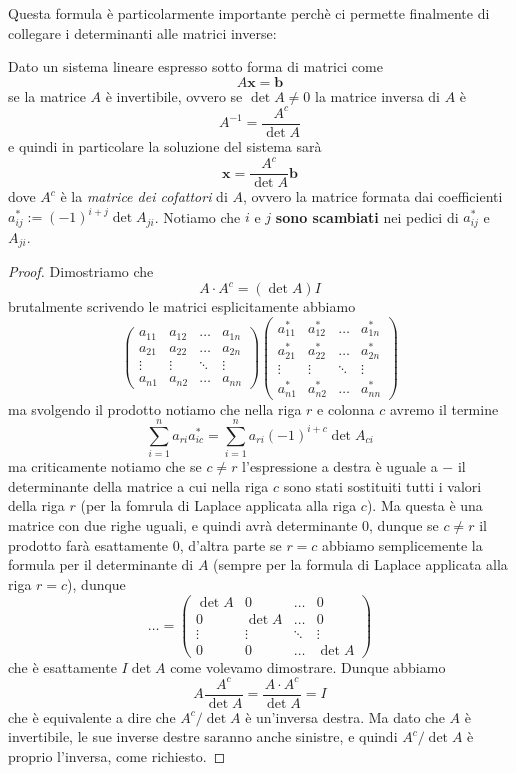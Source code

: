 \documentclass[11pt]{scrartcl}
\begin{document}
   	 Questa formula è particolarmente importante perchè ci permette finalmente di collegare i determinanti alle matrici inverse:
   	 \begin{theorem}[Cramer]
   	 	Dato un sistema lineare espresso sotto forma di matrici come
   	 	$$A\mathbf{x}=\mathbf{b}$$
   	 	se la matrice $A$ è invertibile, ovvero se $\det A \ne 0$ la matrice inversa di $A$ è 
   	 	$$A^{-1}=\frac{A^c}{\det A}$$
   	 	e quindi in particolare la soluzione del sistema sarà
   	 	$$\mathbf{x}=\frac{A^c}{\det A}\mathbf{b}$$
   	 	dove $A^c$ è la \textit{matrice dei cofattori} di $A$, ovvero la matrice formata dai coefficienti $a^*_{ij}:=(-1)^{i+j}\det A_{ji}$. Notiamo che $i$ e $j$ \textbf{sono scambiati} nei pedici di $a^*_{ij}$ e $A_{ji}$.
   	 \end{theorem}
   	 \begin{proof}
   	 	Dimostriamo che 
   	 	$$A\cdot A^c=\left(\det A\right)I$$
   	 	brutalmente scrivendo le matrici esplicitamente abbiamo
   	 	$$
   	 	\begin{pmatrix}
   	 		a_{11} & a_{12} & \dots & a_{1n} \\
   	 		a_{21} & a_{22} & \dots & a_{2n} \\
   	 		\vdots & \vdots & \ddots& \vdots \\
   	 		a_{n1} & a_{n2} & \dots & a_{nn}
   	 	\end{pmatrix}
   	 	\begin{pmatrix}
   	 		a^*_{11} & a^*_{12} & \dots & a^*_{1n} \\
   	 		a^*_{21} & a^*_{22} & \dots & a^*_{2n} \\
   	 		\vdots & \vdots & \ddots& \vdots \\
   	 		a^*_{n1} & a^*_{n2} & \dots & a^*_{nn}
   	 	\end{pmatrix}
   	 	$$
   	 	ma svolgendo il prodotto notiamo che nella riga $r$ e colonna $c$ avremo il termine
   	 	$$\sum_{i=1}^{n}a_{ri}a^*_{ic}=\sum_{i=1}^n a_{ri}(-1)^{i+c}\det A_{ci}$$
   	 	ma criticamente notiamo che se $c\ne r$ l'espressione a destra è uguale a $-$ il determinante della matrice a cui nella riga $c$ sono stati sostituiti tutti i valori della riga $r$ (per la fomrula di Laplace applicata alla riga $c$). Ma questa è una matrice con due righe uguali, e quindi avrà determinante $0$, dunque se $c\ne r$ il prodotto farà esattamente $0$, d'altra parte se $r=c$ abbiamo semplicemente la formula per il determinante di $A$ (sempre per la formula di Laplace applicata alla riga $r=c$), dunque 
   	 	$$\dots = \begin{pmatrix}
   	 		\det A & 0 & \dots & 0 \\
   	 		0 & \det A & \dots & 0 \\
   	 		\vdots & \vdots & \ddots & \vdots \\
   	 		0 & 0 & \dots & \det A
   	 	\end{pmatrix}$$
   	 	che è esattamente $I\det A$ come volevamo dimostrare. Dunque abbiamo
   	 	$$A\frac{A^c}{\det A}=\frac{A\cdot A^c}{\det A}=I$$ 
   	 	che è equivalente a dire che $A^c/\det A$ è un'inversa destra. Ma dato che $A$ è invertibile, le sue inverse destre saranno anche sinistre, e quindi $A^c/\det A$ è proprio l'inversa, come richiesto.
   	 \end{proof}
\end{document}
